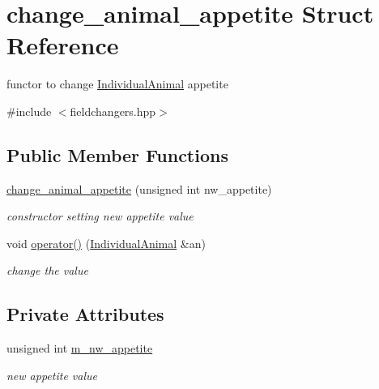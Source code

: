\hypertarget{structchange__animal__appetite}{
\section{change\_\-animal\_\-appetite Struct Reference}
\label{structchange__animal__appetite}
}


functor to change \hyperlink{classIndividualAnimal}{IndividualAnimal} appetite  




{\ttfamily \#include $<$fieldchangers.hpp$>$}

\subsection*{Public Member Functions}
\begin{DoxyCompactItemize}
\item 
\hypertarget{structchange__animal__appetite_ac41f6ae44d1d5c3326193b242b496270}{
\hyperlink{structchange__animal__appetite_ac41f6ae44d1d5c3326193b242b496270}{change\_\-animal\_\-appetite} (unsigned int nw\_\-appetite)}
\label{structchange__animal__appetite_ac41f6ae44d1d5c3326193b242b496270}

\begin{DoxyCompactList}\small\item\em constructor setting new appetite value \end{DoxyCompactList}\item 
\hypertarget{structchange__animal__appetite_adf55d69d445073e692f68bc06cb3abcf}{
void \hyperlink{structchange__animal__appetite_adf55d69d445073e692f68bc06cb3abcf}{operator()} (\hyperlink{classIndividualAnimal}{IndividualAnimal} \&an)}
\label{structchange__animal__appetite_adf55d69d445073e692f68bc06cb3abcf}

\begin{DoxyCompactList}\small\item\em change the value \end{DoxyCompactList}\end{DoxyCompactItemize}
\subsection*{Private Attributes}
\begin{DoxyCompactItemize}
\item 
\hypertarget{structchange__animal__appetite_a88b4e8d511e5ad5c389e79d7cd47cd7a}{
unsigned int \hyperlink{structchange__animal__appetite_a88b4e8d511e5ad5c389e79d7cd47cd7a}{m\_\-nw\_\-appetite}}
\label{structchange__animal__appetite_a88b4e8d511e5ad5c389e79d7cd47cd7a}

\begin{DoxyCompactList}\small\item\em new appetite value \end{DoxyCompactList}\end{DoxyCompactItemize}


